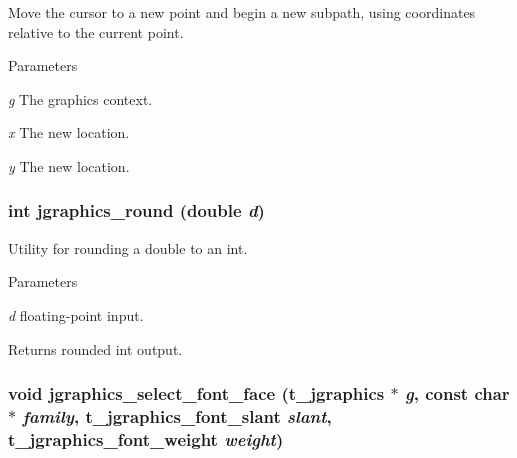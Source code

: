 Move the cursor to a new point and begin a new subpath, using coordinates relative to the current point. 
\begin{DoxyParams}{Parameters}
\item[{\em g}]The graphics context. \item[{\em x}]The new location. \item[{\em y}]The new location. \end{DoxyParams}
\hypertarget{group__jgraphics_ga706be120b247818f2ebb18d96934bb72}{
\subsubsection[{jgraphics\_\-round}]{\setlength{\rightskip}{0pt plus 5cm}int jgraphics\_\-round (double {\em d})}}
\label{group__jgraphics_ga706be120b247818f2ebb18d96934bb72}


Utility for rounding a double to an int. 
\begin{DoxyParams}{Parameters}
\item[{\em d}]floating-\/point input. \end{DoxyParams}
\begin{DoxyReturn}{Returns}
rounded int output. 
\end{DoxyReturn}
\hypertarget{group__jgraphics_ga0c184facd0030b513e63162fca2225cd}{
\subsubsection[{jgraphics\_\-select\_\-font\_\-face}]{\setlength{\rightskip}{0pt plus 5cm}void jgraphics\_\-select\_\-font\_\-face ({\bf t\_\-jgraphics} $\ast$ {\em g}, \/  const char $\ast$ {\em family}, \/  {\bf t\_\-jgraphics\_\-font\_\-slant} {\em slant}, \/  {\bf t\_\-jgraphics\_\-font\_\-weight} {\em weight})}}
\label{group__jgraphics_ga0c184facd0030b513e63162fca2225cd}



